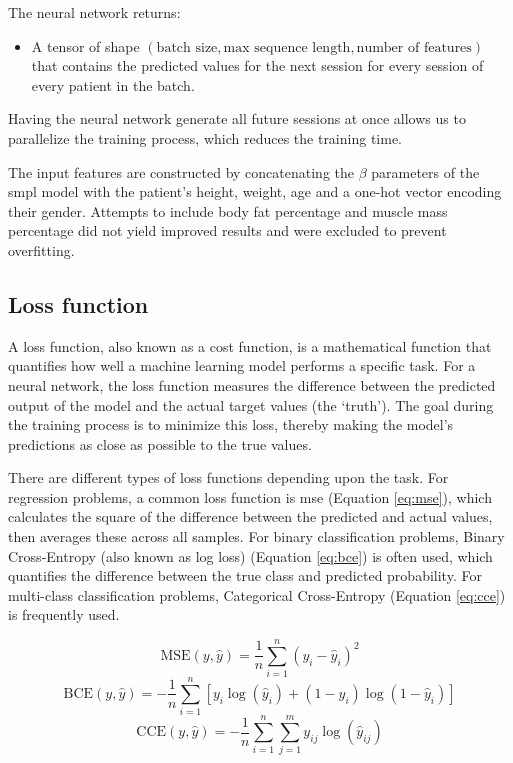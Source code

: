 The neural network returns:

\begin{itemize}
	\item A tensor of shape $(\text{batch size}, \text{max sequence length}, \text{number
			      of features})$ that contains the predicted values for the next session for
	      every session of every patient in the batch.
\end{itemize}

Having the neural network generate all future sessions at once allows us to
parallelize the training process, which reduces the training time.

The input features are constructed by concatenating the $\beta$ parameters of
the \gls{smpl} model with the patient's height, weight, age and a one-hot
vector encoding their gender. Attempts to include body fat percentage and
muscle mass percentage did not yield improved results and were excluded to
prevent overfitting.

\subsection{Loss function}

A loss function, also known as a cost function, is a mathematical function that
quantifies how well a machine learning model performs a specific task. For a
neural network, the loss function measures the difference between the predicted
output of the model and the actual target values (the `truth'). The goal during
the training process is to minimize this loss, thereby making the model's
predictions as close as possible to the true values.

There are different types of loss functions depending upon the task. For
regression problems, a common loss function is \gls{mse} (Equation
\ref{eq:mse}), which calculates the square of the difference between the
predicted and actual values, then averages these across all samples. For binary
classification problems, Binary Cross-Entropy (also known as log loss)
(Equation \ref{eq:bce}) is often used, which quantifies the difference between
the true class and predicted probability. For multi-class classification
problems, Categorical Cross-Entropy (Equation \ref{eq:cce}) is frequently used.

\begin{equation}
	\text{MSE}(y, \hat{y}) = \frac{1}{n} \sum_{i=1}^{n}(y_i - \hat{y}_i)^2
	\label{eq:mse}
\end{equation}
\begin{equation}
	\text{BCE}(y, \hat{y}) = -\frac{1}{n} \sum_{i=1}^{n} [y_i \log(\hat{y}_i) + (1 - y_i) \log(1 - \hat{y}_i)]
	\label{eq:bce}
\end{equation}
\begin{equation}
	\text{CCE}(y, \hat{y}) = -\frac{1}{n} \sum_{i=1}^{n} \sum_{j=1}^{m} y_{ij} \log(\hat{y}_{ij})
	\label{eq:cce}
\end{equation}


